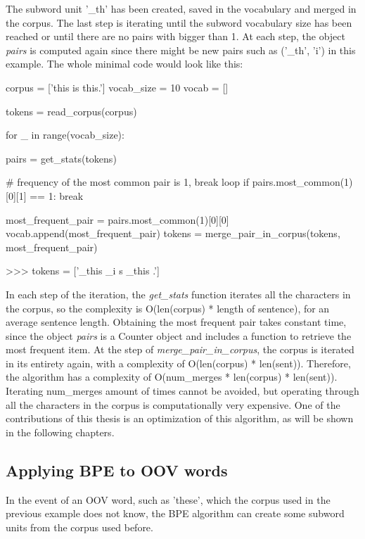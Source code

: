 The subword unit '\_th' has been created, saved in the vocabulary and merged in the corpus. The last step is iterating until the subword vocabulary size has been reached or until there are no pairs with bigger than 1. At each step, the object \emph{pairs} is computed again since there might be new pairs such as ('\_th', 'i') in this example. The whole minimal code would look like this:

\begin{python}
corpus = ['this is this.']
vocab_size = 10
vocab = []

tokens = read_corpus(corpus)

for _ in range(vocab_size):

    pairs = get_stats(tokens)

    # frequency of the most common pair is 1, break loop
    if pairs.most_common(1)[0][1] == 1:
        break

    most_frequent_pair = pairs.most_common(1)[0][0]
    vocab.append(most_frequent_pair)
    tokens = merge_pair_in_corpus(tokens, most_frequent_pair)

>>> tokens = ['_this _i s _this .']
\end{python}

In each step of the iteration, the \emph{get\_stats} function iterates all the characters in the corpus, so the complexity is O(len(corpus) * length of sentence), for an average sentence length. Obtaining the most frequent pair takes constant time, since the object \emph{pairs} is a Counter object and includes a function to retrieve the most frequent item. At the step of \emph{merge\_pair\_in\_corpus}, the corpus is iterated in its entirety again, with a complexity of O(len(corpus) * len(sent)). Therefore, the algorithm has a complexity of O(num\_merges * len(corpus) * len(sent)). Iterating num\_merges amount of times cannot be avoided, but operating through all the characters in the corpus is computationally very expensive. One of the contributions of this thesis is an optimization of this algorithm, as will be shown in the following chapters.

\subsection{Applying BPE to OOV words}

In the event of an OOV word, such as 'these', which the corpus used in the previous example does not know, the BPE algorithm can create some subword units from the corpus used before.

